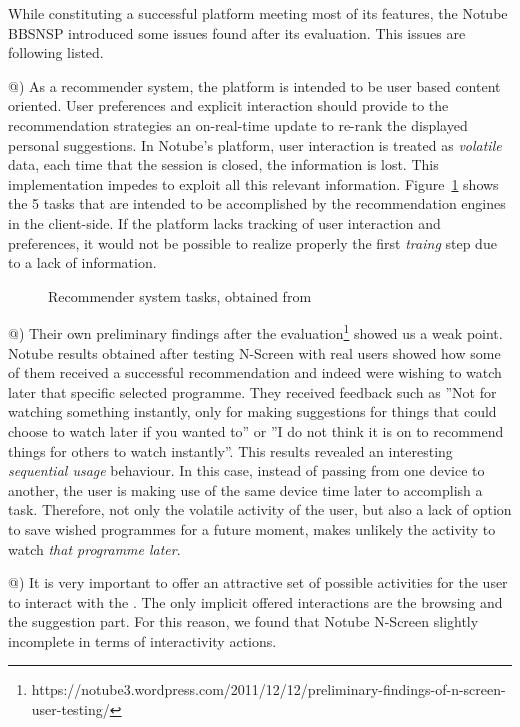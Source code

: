 \documentclass{acm_proc_article-sp}
\makeatletter
\newcommand*{\rom}[1]{\expandafter\@slowromancap\romannumeral #1@}
\makeatother
\begin{document}
While constituting a successful platform meeting most of its features, the Notube BBSNSP introduced some issues found after its evaluation. This issues are following listed. 

\rom{1}) As a recommender system, the platform is intended to be user based content oriented. User preferences and explicit interaction should provide to the recommendation strategies an on-real-time update to re-rank the displayed personal suggestions\cite{libbyrecommender}. In Notube's platform, user interaction is treated as \textit{volatile} data, each time that the session is closed, the information is lost. This implementation impedes to exploit all this relevant information. Figure~\ref{fig:recomm} shows the 5 tasks that are intended to be accomplished by the recommendation engines in the client-side. If the platform lacks tracking of user interaction and preferences, it would not be possible to realize properly the first \textit{traing} step due to a lack of information.

\begin{figure}[!htb]
\centering
{}
\caption{Recommender system tasks, obtained from \cite{libbyrecommender}}
\label{fig:recomm}
\end{figure}

\rom{2}) Their own preliminary findings after the evaluation\footnote{https://notube3.wordpress.com/2011/12/12/preliminary-findings-of-n-screen-user-testing/} showed us a weak point. Notube results obtained after testing N-Screen with real users showed how some of them received a successful recommendation and indeed were wishing to watch later that specific selected programme. They received feedback such as ''Not for watching something instantly, only for making suggestions for things that could choose to watch later if you wanted to'' or ''I do not think it is on to recommend things for others to watch instantly''. This results revealed an interesting \textit{sequential usage} behaviour. In this case, instead of passing from one device to another, the user is making use of the same device time later to accomplish a task. Therefore, not only the volatile activity of the user, but also a lack of option to save wished programmes for a future moment, makes unlikely the activity to watch \textit{that programme later}. 

\rom{3}) It is very important to offer an attractive set of possible activities for the user to interact with the \cite{skadberg2004visitors}. The only implicit offered interactions are the browsing and the suggestion part. For this reason, we found that Notube N-Screen slightly incomplete in terms of interactivity actions. 
\end{document}
